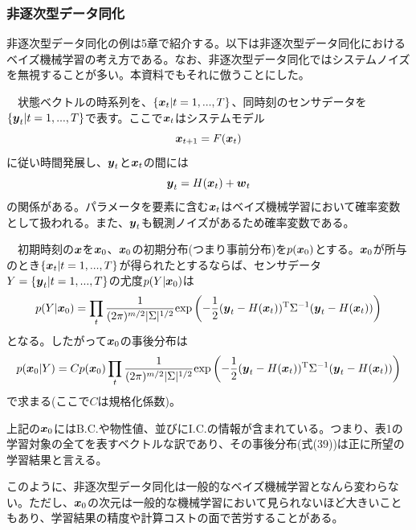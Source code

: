 \documentclass[dvipdfmx, 9pt, a4paper]{jsarticle}
\newcommand{\bm}[1]{{\mbox{\boldmath $#1$}}}
\begin{document}
\subsubsection{非逐次型データ同化}
非逐次型データ同化の例は5章で紹介する。以下は非逐次型データ同化におけるベイズ機械学習の考え方である。なお、非逐次型データ同化ではシステムノイズを無視することが多い。本資料でもそれに倣うことにした。
\begin{tcolorbox}[title=非逐次データ同化]
　状態ベクトルの時系列を、$\{ \bm x_t|t=1,...,T \}$、同時刻のセンサデータを$\{ \bm y_t|t=1,...,T\}$で表す。ここで$\bm x_t$はシステムモデル
\begin{equation}
\bm x_{t+1}=F(\bm x_t) \notag
\end{equation}
に従い時間発展し、$\bm y_t$と$\bm x_t$の間には
\begin{equation}
\bm y_t=H(\bm x_t)+\bm w_t \notag
\end{equation}
の関係がある。パラメータを要素に含む$\bm x_t$はベイズ機械学習において確率変数として扱われる。また、$\bm y_t$も観測ノイズがあるため確率変数である。\par
　初期時刻の$\bm x$を$\bm x_0$、$\bm x_0$の初期分布(つまり事前分布)を$p(\bm x_0)$とする。$\bm x_0$が所与のとき$\{ \bm x_t|t=1,...,T \}$が得られたとするならば、センサデータ$Y=\{ \bm y_t|t=1,...,T\}$の尤度$p(Y|\bm x_0)$は
\begin{equation}
p(Y|\bm x_0)=\prod_t \frac{1}{(2\pi)^{m/2}|\Sigma|^{1/2}}{\rm exp}\left(
-\frac{1}{2}(\bm y_t-H(\bm x_t))^{\rm T}\Sigma^{-1}(\bm y_t-H(\bm x_t))
\right) \notag
\end{equation}
となる。したがって$\bm x_0$の事後分布は
\begin{equation}
p(\bm x_0|Y)=Cp(\bm x_0)
\prod_t \frac{1}{(2\pi)^{m/2}|\Sigma|^{1/2}}{\rm exp}\left(
-\frac{1}{2}(\bm y_t-H(\bm x_t))^{\rm T}\Sigma^{-1}(\bm y_t-H(\bm x_t))
\right)
\end{equation}
で求まる(ここで$C$は規格化係数)。
\end{tcolorbox}
上記の$\bm x_0$にはB.C.や物性値、並びにI.C.の情報が含まれている。つまり、表1の学習対象の全てを表すベクトルな訳であり、その事後分布(式(39))は正に所望の学習結果と言える。\par
このように、非逐次型データ同化は一般的なベイズ機械学習となんら変わらない。ただし、$\bm x_0$の次元は一般的な機械学習において見られないほど大きいこともあり、学習結果の精度や計算コストの面で苦労することがある。
\end{document}

